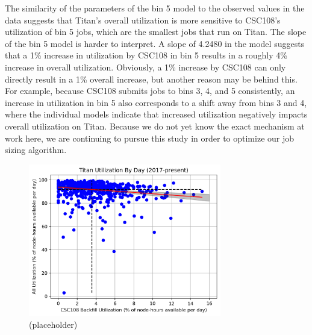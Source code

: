 The similarity of the parameters of the bin 5 model to the observed values in
the data suggests that Titan's overall utilization is more sensitive to
CSC108's utilization of bin 5 jobs, which are the smallest jobs that run on
Titan. The slope of the bin 5 model is harder to interpret. A slope of 4.2480
in the model suggests that a 1\% increase in utilization by CSC108 in bin 5
results in a roughly 4\% increase in overall utilization. Obviously, a 1\%
increase by CSC108 can only directly result in a 1\% overall increase, but
another reason may be behind this. For example, because CSC108 submits jobs to
bins 3, 4, and 5 consistently, an increase in utilization in bin 5 also
corresponds to a shift away from bins 3 and 4, where the individual models
indicate that increased utilization negatively impacts overall utilization on
Titan. Because we do not yet know the exact mechanism at work here, we are
continuing to pursue this study in order to optimize our job sizing algorithm.


\begin{figure}
  \includegraphics[width=0.75\textwidth]{images/linfit-utilization-by-true-day-all.png}
\caption{(placeholder)}
\label{fig:utilization-all}
\end{figure}


